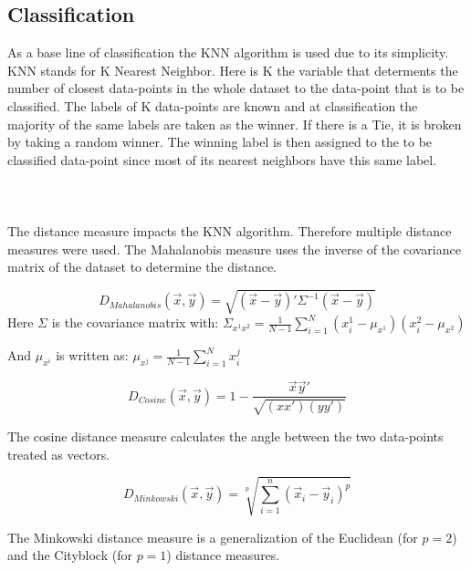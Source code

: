 


\subsection{Classification}

As a base line of classification the KNN algorithm is used due to its simplicity. KNN stands for K Nearest Neighbor. Here is K the variable that determents the number of closest data-points in the whole dataset to the data-point that is to be classified. The labels of K data-points are known and at classification the majority of the same labels are taken as the winner. If there is a Tie, it is broken by taking a random winner. The winning label is then assigned to the to be classified data-point since most of its nearest neighbors have this same label.
\\\\
\\\\
The distance measure impacts the KNN algorithm. Therefore multiple distance measures were used. The Mahalanobis measure uses the inverse of the covariance matrix of the dataset to determine the distance.

\begin{equation}
D_{Mahalanobis}(\vec{x},\vec{y}) = \sqrt{(\vec{x}-\vec{y})'\Sigma^{-1}(\vec{x}-\vec{y})} 
\end{equation}
\bigskip
\noindent Here $\Sigma$ is the covariance matrix with: $\Sigma_{x^1x^2} = \frac{1}{N-1} \sum_{i=1}^{N}(x_i^1-\mu_{x^1})(x_i^2-\mu_{x^2})$ 

\noindent And $\mu_{x^i}$ is written as: $\mu_{x^j} = \frac{1}{N-1}\sum_{i=1}^N x_i^j$

\begin{equation}
D_{Cosine}(\vec{x},\vec{y})= 1 - \frac{\vec{x}\vec{y}'}{\sqrt{(xx')(yy')}}
\end{equation}

\noindent The cosine distance measure calculates the angle between the two data-points treated as vectors.

\begin{equation}
D_{Minkowski}(\vec{x},\vec{y}) = \sqrt[p]{\sum^n_{i=1}(\vec{x}_i-\vec{y}_i)^p}
\end{equation}

\noindent The Minkowski distance measure is a generalization of the Euclidean (for $p=2$) and the Cityblock (for $p=1$) distance measures.

